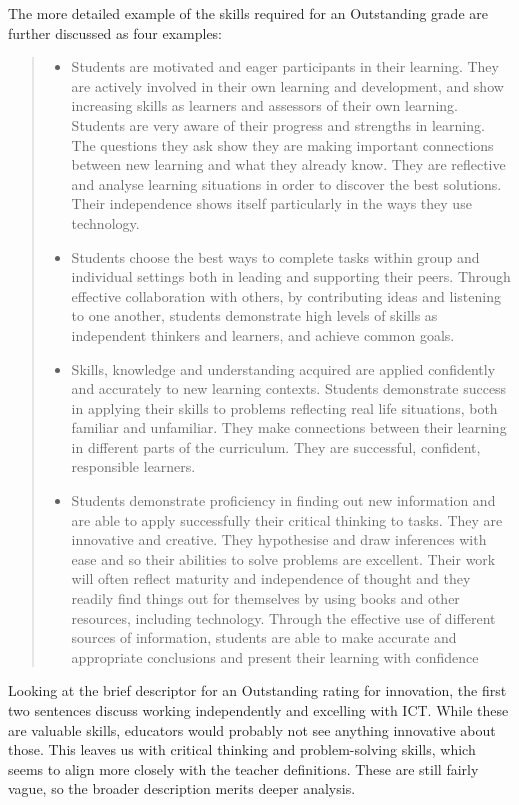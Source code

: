 \documentclass[11pt]{article}
\begin{document}
The more detailed example of the skills required for an Outstanding grade are further discussed as four examples:
\begin{quote}
	\begin{itemize}
		\item Students are motivated and eager participants in their learning. They are actively involved in their own learning and development, and show increasing skills as learners and assessors of their own learning. Students are very aware of their progress and strengths in learning. The questions they ask show they are making important connections between new learning and what they already know. They are reflective and analyse learning situations in order to discover the best solutions. Their independence shows itself particularly in the ways they use technology.
		\item Students choose the best ways to complete tasks within group and individual settings both in leading and supporting their peers. Through effective collaboration with others, by contributing ideas and listening to one another, students demonstrate high levels of skills as independent thinkers and learners, and achieve common goals.
		\item Skills, knowledge and understanding acquired are applied confidently and accurately to new learning contexts. Students demonstrate success in applying their skills to problems reflecting real life situations, both familiar and unfamiliar. They make connections between their learning in different parts of the curriculum. They are successful, confident, responsible learners.
		\item Students demonstrate proficiency in finding out new information and are able to apply successfully their critical thinking to tasks. They are innovative and creative. They hypothesise and draw inferences with ease and so their abilities to solve problems are excellent. Their work will often reflect maturity and independence of thought and they readily find things out for themselves by using books and other resources, including technology. Through the effective use of different sources of information, students are able to make accurate and appropriate conclusions and present their learning with confidence
	\end{itemize}
\end{quote} \cite[p. 34]{ADEC2016}

Looking at the brief descriptor for an Outstanding rating for innovation, the first two sentences discuss working independently and excelling with ICT. While these are valuable skills, educators would probably not see anything innovative about those. This leaves us with critical thinking and problem-solving skills, which seems to align more closely with the teacher definitions. These are still fairly vague, so the broader description merits deeper analysis. 
\end{document}
